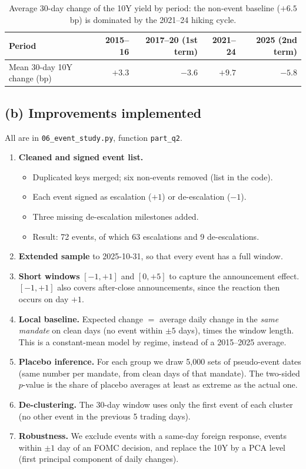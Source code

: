 \documentclass[11pt]{article}
\begin{document}
\begin{table}[h]
\centering
\small
\begin{tabular}{lrrrr}
\toprule
Period & 2015--16 & 2017--20 (1st term) & 2021--24 & 2025 (2nd term) \\
\midrule
Mean 30-day 10Y change (bp) & $+3.3$ & $-3.6$ & $+9.7$ & $-5.8$ \\
\bottomrule
\end{tabular}
\caption{Average 30-day change of the 10Y yield by period: the non-event
baseline ($+6.5$bp) is dominated by the 2021--24 hiking cycle.}
\label{tab:drift}
\end{table}

\subsection*{(b) Improvements implemented}
All are in \texttt{06\_event\_study.py}, function \texttt{part\_q2}.
\begin{enumerate}[leftmargin=1.4em,itemsep=1pt]
\item \textbf{Cleaned and signed event list.}
\begin{itemize}[nosep]
\item Duplicated keys merged; six non-events removed (list in the code).
\item Each event signed as escalation ($+1$) or de-escalation ($-1$).
\item Three missing de-escalation milestones added.
\item Result: 72 events, of which 63 escalations and 9 de-escalations.
\end{itemize}
\item \textbf{Extended sample} to 2025-10-31, so that every event has a full
window.
\item \textbf{Short windows} $[-1,+1]$ and $[0,+5]$ to capture the
announcement effect. $[-1,+1]$ also covers after-close announcements, since
the reaction then occurs on day $+1$.
\item \textbf{Local baseline.} Expected change $=$ average daily change in
the \emph{same mandate} on clean days (no event within $\pm5$ days), times
the window length. This is a constant-mean model by regime, instead of a
2015--2025 average.
\item \textbf{Placebo inference.} For each group we draw 5{,}000 sets of
pseudo-event dates (same number per mandate, from clean days of that
mandate). The two-sided $p$-value is the share of placebo averages at least
as extreme as the actual one.
\item \textbf{De-clustering.} The 30-day window uses only the first event of
each cluster (no other event in the previous 5 trading days).
\item \textbf{Robustness.} We exclude events with a same-day foreign response,
events within $\pm1$ day of an FOMC decision, and replace the 10Y by a PCA
level (first principal component of daily changes).
\end{enumerate}
\end{document}
